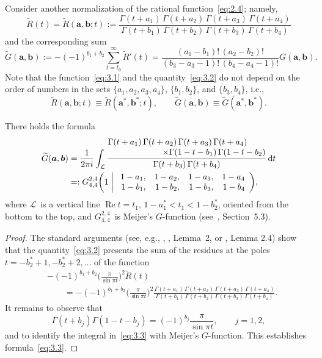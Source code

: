 \documentclass[a4paper,twoside]{article}
\numberwithin{equation}{section}
\renewcommand{\[}{\lfloor}
\renewcommand{\]}{\rfloor}
\newcommand{\<}{\langle}
\renewcommand{\>}{\rangle}
\renewcommand{\d}{\mathrm{d}}
\newcommand{\wt}{\widetilde}
\DeclareMathOperator{\Real}{Re}
\renewcommand{\Re}{\Real}
\newcommand{\rom}[1]{{\rm#1}}
\newcommand{\ba}{\boldsymbol a}
\newcommand{\bb}{\boldsymbol b}
\newcommand{\sL}{\mathcal L}
\begin{document}
Consider another normalization of the rational function~\eqref{eq:2.4};
namely,
\begin{equation}
\wt R(t)
=\wt R(\ba,\bb;t)
:=\frac{\Gamma(t+a_1)\,\Gamma(t+a_2)\,\Gamma(t+a_3)\,\Gamma(t+a_4)}
{\Gamma(t+b_1)\,\Gamma(t+b_2)\,\Gamma(t+b_3)\,\Gamma(t+b_4)}
\label{eq:3.1}
\end{equation}
and the corresponding sum
\begin{equation}
\wt G(\ba,\bb)
:=-(-1)^{b_1+b_2}\sum_{t=t_0}^\infty\wt R'(t)
=\frac{(a_1-b_1)!\,(a_2-b_2)!}
{(b_3-a_3-1)!\,(b_4-a_4-1)!}G(\ba,\bb).
\label{eq:3.2}
\end{equation}
Note that the function~\eqref{eq:3.1} and the quantity~\eqref{eq:3.2}
do not depend on the order of numbers in the sets
$\{a_1,a_2,a_3,a_4\}$, $\{b_1,b_2\}$, and $\{b_3,b_4\}$, i.e.,
$$
\wt R(\ba,\bb;t)\equiv\wt R(\ba^*,\bb^*;t),
\qquad
\wt G(\ba,\bb)\equiv\wt G(\ba^*,\bb^*).
$$

\begin{lemma}
\label{lem:5}
There holds the formula
\begin{align}
\wt G(\ba,\bb)
&=\frac1{2\pi i}\int_{\sL}
\frac{\begin{aligned}
\Gamma(t+a_1)\,\Gamma(t+a_2)\,\Gamma(t+a_3)\,\Gamma(t+a_4)\,
\qquad \\[-3pt] \times
\Gamma(1-t-b_1)\,\Gamma(1-t-b_2)
\end{aligned}}
{\Gamma(t+b_3)\,\Gamma(t+b_4)}\,\d t
\nonumber\\
&=:G_{4,4}^{2,4}\biggl(1\biggm|\begin{array}{rrrr}
1-a_1, & 1-a_2, & 1-a_3, & 1-a_4 \\
1-b_1, & 1-b_2, & 1-b_3, & 1-b_4
\end{array}\biggr),
\label{eq:3.3}
\end{align}
where $\sL$~is a vertical line $\Re t=t_1$\rom, $1-a_1^*<t_1<1-b_2^*$\rom,
oriented from the bottom to the top\rom, and $G_{4,4}^{2,4}$~is Meijer's
$G$-function \rm(see~\cite{Lu}, Section~5.3).
\end{lemma}

\begin{proof}
The standard arguments (see, e.g., \cite{Gu}, \cite{Ne1}, Lemma~2,
or \cite{Zu3}, Lemma 2.4) show that the quantity~\eqref{eq:3.2}
presents the sum of the residues at the poles
$t=-b_2^*+1,-b_2^*+2,\dots$ of the function
\begin{align*}
&
-(-1)^{b_1+b_2}
\biggl(\frac\pi{\sin\pi t}\biggr)^2\wt R(t)
\\ &\qquad
=-(-1)^{b_1+b_2}
\biggl(\frac\pi{\sin\pi t}\biggr)^2
\frac{\Gamma(t+a_1)\,\Gamma(t+a_2)\,\Gamma(t+a_3)\,\Gamma(t+a_4)}
{\Gamma(t+b_1)\,\Gamma(t+b_2)\,\Gamma(t+b_3)\,\Gamma(t+b_4)}.
\end{align*}
It remains to observe that
\begin{equation}
\Gamma(t+b_j)\Gamma(1-t-b_j)=(-1)^{b_j}\frac\pi{\sin\pi t},
\qquad j=1,2,
\label{eq:3.4}
\end{equation}
and to identify the integral in~\eqref{eq:3.3} with Meijer's $G$-function.
This establishes formula~\eqref{eq:3.3}.
\end{proof}
\end{document}

